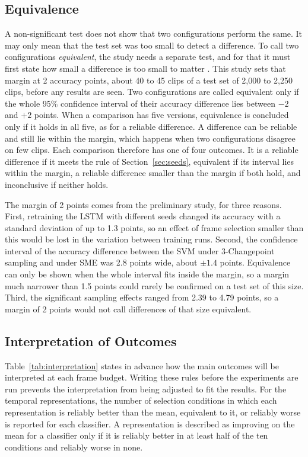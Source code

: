 \subsection{Equivalence}

A non-significant test does not show that two configurations perform the same. It may only mean that the test set was too small to detect a difference. To call two configurations \emph{equivalent}, the study needs a separate test, and for that it must first state how small a difference is too small to matter \cite{lakens2017}. This study sets that margin at 2 accuracy points, about 40 to 45 clips of a test set of 2,000 to 2,250 clips, before any results are seen. Two configurations are called equivalent only if the whole 95\% confidence interval of their accuracy difference lies between $-2$ and $+2$ points. When a comparison has five versions, equivalence is concluded only if it holds in all five, as for a reliable difference. A difference can be reliable and still lie within the margin, which happens when two configurations disagree on few clips. Each comparison therefore has one of four outcomes. It is a reliable difference if it meets the rule of Section~\ref{sec:seeds}, equivalent if its interval lies within the margin, a reliable difference smaller than the margin if both hold, and inconclusive if neither holds.

The margin of 2 points comes from the preliminary study, for three reasons. First, retraining the LSTM with different seeds changed its accuracy with a standard deviation of up to 1.3 points, so an effect of frame selection smaller than this would be lost in the variation between training runs. Second, the confidence interval of the accuracy difference between the SVM under 3-Changepoint sampling and under SME was 2.8 points wide, about $\pm 1.4$ points. Equivalence can only be shown when the whole interval fits inside the margin, so a margin much narrower than 1.5 points could rarely be confirmed on a test set of this size. Third, the significant sampling effects ranged from 2.39 to 4.79 points, so a margin of 2 points would not call differences of that size equivalent.

\subsection{Interpretation of Outcomes}

Table~\ref{tab:interpretation} states in advance how the main outcomes will be interpreted at each frame budget. Writing these rules before the experiments are run prevents the interpretation from being adjusted to fit the results. For the temporal representations, the number of selection conditions in which each representation is reliably better than the mean, equivalent to it, or reliably worse is reported for each classifier. A representation is described as improving on the mean for a classifier only if it is reliably better in at least half of the ten conditions and reliably worse in none.

